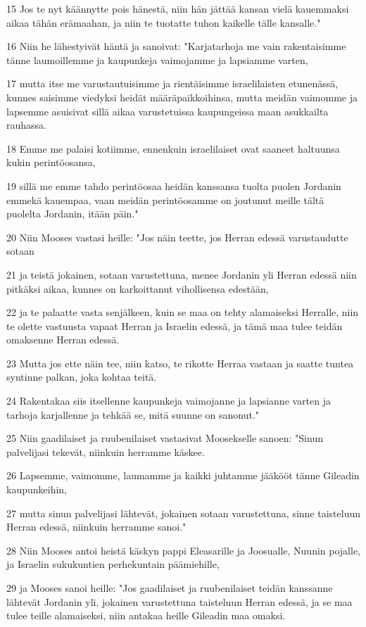 \par 15 Jos te nyt käännytte pois hänestä, niin hän jättää kansan vielä kauemmaksi aikaa tähän erämaahan, ja niin te tuotatte tuhon kaikelle tälle kansalle."
\par 16 Niin he lähestyivät häntä ja sanoivat: "Karjatarhoja me vain rakentaisimme tänne laumoillemme ja kaupunkeja vaimojamme ja lapsiamme varten,
\par 17 mutta itse me varustautuisimme ja rientäisimme israelilaisten etunenässä, kunnes saisimme viedyksi heidät määräpaikkoihinsa, mutta meidän vaimomme ja lapsemme asuisivat sillä aikaa varustetuissa kaupungeissa maan asukkailta rauhassa.
\par 18 Emme me palaisi kotiimme, ennenkuin israelilaiset ovat saaneet haltuunsa kukin perintöosansa,
\par 19 sillä me emme tahdo perintöosaa heidän kanssansa tuolta puolen Jordanin emmekä kauempaa, vaan meidän perintöosamme on joutunut meille tältä puolelta Jordanin, itään päin."
\par 20 Niin Mooses vastasi heille: "Jos näin teette, jos Herran edessä varustaudutte sotaan
\par 21 ja teistä jokainen, sotaan varustettuna, menee Jordanin yli Herran edessä niin pitkäksi aikaa, kunnes on karkoittanut vihollisensa edestään,
\par 22 ja te palaatte vasta senjälkeen, kuin se maa on tehty alamaiseksi Herralle, niin te olette vastuusta vapaat Herran ja Israelin edessä, ja tämä maa tulee teidän omaksenne Herran edessä.
\par 23 Mutta jos ette näin tee, niin katso, te rikotte Herraa vastaan ja saatte tuntea syntinne palkan, joka kohtaa teitä.
\par 24 Rakentakaa siis itsellenne kaupunkeja vaimojanne ja lapsianne varten ja tarhoja karjallenne ja tehkää se, mitä suunne on sanonut."
\par 25 Niin gaadilaiset ja ruubenilaiset vastasivat Moosekselle sanoen: "Sinun palvelijasi tekevät, niinkuin herramme käskee.
\par 26 Lapsemme, vaimomme, laumamme ja kaikki juhtamme jääkööt tänne Gileadin kaupunkeihin,
\par 27 mutta sinun palvelijasi lähtevät, jokainen sotaan varustettuna, sinne taisteluun Herran edessä, niinkuin herramme sanoi."
\par 28 Niin Mooses antoi heistä käskyn pappi Eleasarille ja Joosualle, Nuunin pojalle, ja Israelin sukukuntien perhekuntain päämiehille,
\par 29 ja Mooses sanoi heille: "Jos gaadilaiset ja ruubenilaiset teidän kanssanne lähtevät Jordanin yli, jokainen varustettuna taisteluun Herran edessä, ja se maa tulee teille alamaiseksi, niin antakaa heille Gileadin maa omaksi.
